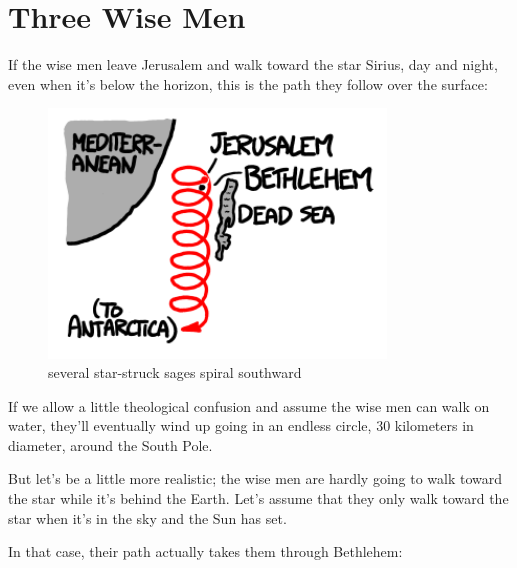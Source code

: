 {
\chapter{Three Wise Men}
}

\hfill{}

{If the wise men leave Jerusalem and walk toward the star Sirius, day and night, even when it’s below the horizon, this is the path they follow over the surface:}

\begin{figure}[!htbp]
\centering
\includegraphics[scale=0.5, max width=0.8\textwidth]{imgs/a/25/magi_sirius_walk.png}
\caption{several star-struck sages spiral southward}
\end{figure}

{If we allow a little theological confusion and assume the wise men can walk on water, they’ll eventually wind up going in an endless circle, 30 kilometers in diameter, around the South Pole.}

{But let’s be a little more realistic; the wise men are hardly going to walk toward the star while it’s behind the Earth. Let’s assume that they only walk toward the star when it’s in the sky and the Sun has set.}

{In that case, their path actually takes them through Bethlehem:}

